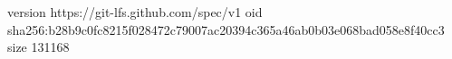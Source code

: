 version https://git-lfs.github.com/spec/v1
oid sha256:b28b9c0fc8215f028472c79007ac20394c365a46ab0b03e068bad058e8f40cc3
size 131168
